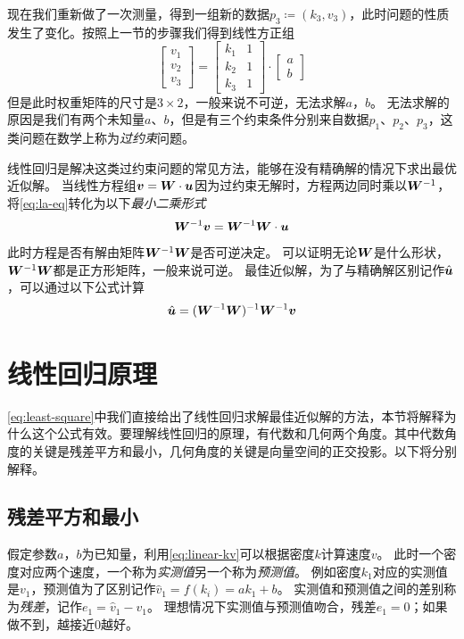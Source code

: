 现在我们重新做了一次测量，得到一组新的数据$p_3\coloneqq(k_3, v_3)$，此时问题的性质发生了变化。按照上一节的步骤我们得到线性方正组
\begin{equation}\label{eq:la-kv-3}
    \begin{bmatrix}
        v_1\\
        v_2\\
        v_3
    \end{bmatrix}=
    \begin{bmatrix}
        k_1 & 1\\
        k_2 & 1\\
        k_3 & 1
    \end{bmatrix}\cdot
    \begin{bmatrix}
        a\\
        b
    \end{bmatrix}
\end{equation}
但是此时权重矩阵的尺寸是$3\times2$，一般来说不可逆，无法求解$a$，$b$。
无法求解的原因是我们有两个未知量$a$、$b$，但是有三个约束条件分别来自数据$p_1$、$p_2$、$p_3$，这类问题在数学上称为\emph{过约束}问题。

线性回归是解决这类过约束问题的常见方法，能够在没有精确解的情况下求出最优近似解。
当线性方程组$\bm{v}=\bm{W}\cdot\bm{u}$因为过约束无解时，方程两边同时乘以$\bm{W}^{-1}$，将\cref{eq:la-eq}转化为以下\emph{最小二乘形式}
\begin{equation}\label{eq:least-square}
    \bm{W}^{-1}\bm{v}=\bm{W}^{-1}\bm{W}\cdot\bm{u}
\end{equation}
此时方程是否有解由矩阵$\bm{W}^{-1}\bm{W}$是否可逆决定。
可以证明无论$\bm{W}$是什么形状，$\bm{W}^{-1}\bm{W}$都是正方形矩阵，一般来说可逆。
最佳近似解，为了与精确解区别记作$\hat{\bm{u}}$，可以通过以下公式计算
\begin{equation}
    \hat{\bm{u}}=(\bm{W}^{-1}\bm{W})^{-1}\bm{W}^{-1}\bm{v}
\end{equation}

\section{线性回归原理}

\cref{eq:least-square}中我们直接给出了线性回归求解最佳近似解的方法，本节将解释为什么这个公式有效。要理解线性回归的原理，有代数和几何两个角度。其中代数角度的关键是残差平方和最小，几何角度的关键是向量空间的正交投影。以下将分别解释。

\subsection{残差平方和最小}
假定参数$a$，$b$为已知量，利用\cref{eq:linear-kv}可以根据密度$k$计算速度$v$。
此时一个密度对应两个速度，一个称为\emph{实测值}另一个称为\emph{预测值}。
例如密度$k_1$对应的实测值是$v_1$，预测值为了区别记作$\hat{v}_1=f(k_i)=ak_1+b$。
实测值和预测值之间的差别称为\emph{残差}，记作$e_1=\hat{v}_1-v_1$。
理想情况下实测值与预测值吻合，残差$e_1=0$；如果做不到，越接近$0$越好。

